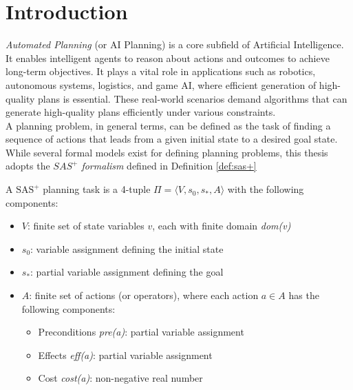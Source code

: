 \chapter{Introduction}
\label{ch:intro}
\textit{Automated Planning} (or AI Planning) is a core subfield of Artificial Intelligence.
It enables intelligent agents to reason about actions and outcomes to
achieve long-term objectives. It plays a vital role in applications such as robotics,
autonomous systems, logistics, and game AI, where efficient generation of high-quality plans is essential.
These real-world scenarios demand algorithms that can generate
high-quality plans efficiently under various constraints.\\
A planning problem, in general terms, can be defined as the task of finding a sequence
of actions that leads from a given initial state to a desired goal state.
While several formal models exist for defining planning problems, this thesis
adopts the \textit{$SAS^+$ formalism} defined in Definition \ref{def:sas+}

\begin{definition}
	\label{def:sas+}
	A $\text{SAS}^+$ planning task is a 4-tuple $\Pi = \langle V, s_0, s_*, A \rangle$ with
	the following components:
	\begin{itemize}
		\item \(V\): finite set of state variables \(v\),
		      each with finite domain \textit{dom(v)}
		\item \(s_0\): variable assignment defining the initial state
		\item \(s_*\): partial variable assignment defining the goal
		\item \(A\): finite set of actions (or operators),
		      where each action $a \in A$ has the following components:
		      \begin{itemize}
			      \item Preconditions \textit{pre(a)}: partial variable assignment
			      \item Effects \textit{eff(a)}: partial variable assignment
			      \item Cost \textit{cost(a)}: non-negative real number
		      \end{itemize}
	\end{itemize}
\end{definition}

